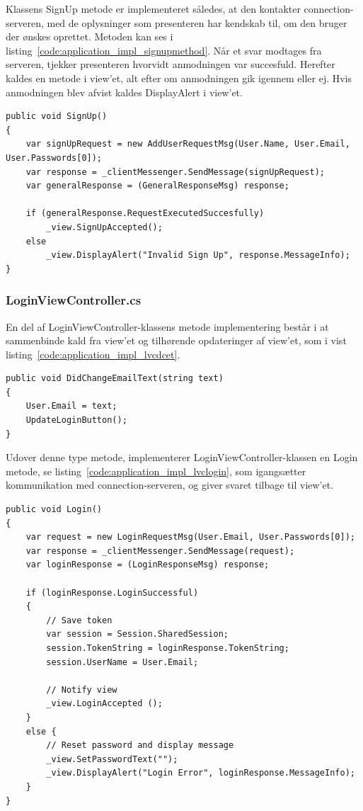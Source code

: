 Klassens SignUp metode er implementeret således, at den kontakter connection-serveren, med de oplysninger som presenteren har kendskab til, om den bruger der ønskes oprettet. Metoden kan ses i listing~\ref{code:application_impl_signupmethod}. Når et svar modtages fra serveren, tjekker presenteren hvorvidt anmodningen var succesfuld. Herefter kaldes en metode i view'et, alt efter om anmodningen gik igennem eller ej. Hvis anmodningen blev afvist kaldes DisplayAlert i view'et.

\begin{lstlisting}[caption={SignUp()},label={code:application_impl_signupmethod}]
public void SignUp()
{
	var signUpRequest = new AddUserRequestMsg(User.Name, User.Email, User.Passwords[0]);
	var response = _clientMessenger.SendMessage(signUpRequest);
	var generalResponse = (GeneralResponseMsg) response;

	if (generalResponse.RequestExecutedSuccesfully)
		_view.SignUpAccepted();
	else
		_view.DisplayAlert("Invalid Sign Up", response.MessageInfo);
}
\end{lstlisting}

\subsubsection{LoginViewController.cs}
En del af LoginViewController-klassens metode implementering består i at sammenbinde kald fra view'et og tilhørende opdateringer af view'et, som i vist listing~\ref{code:application_impl_lvcdcet}.

\begin{lstlisting}[caption={DidChangeEmailText(...)},label={code:application_impl_lvcdcet}]
public void DidChangeEmailText(string text)
{
	User.Email = text;
	UpdateLoginButton();
}
\end{lstlisting}

Udover denne type metode, implementerer LoginViewController-klassen en Login metode, se listing~\ref{code:application_impl_lvclogin}, som igangsætter kommunikation med connection-serveren, og giver svaret tilbage til view'et. 

\begin{lstlisting}[caption={Login()},label={code:application_impl_lvclogin}]
 public void Login()
{
	var request = new LoginRequestMsg(User.Email, User.Passwords[0]);
	var response = _clientMessenger.SendMessage(request);
	var loginResponse = (LoginResponseMsg) response;

	if (loginResponse.LoginSuccessful)
	{
		// Save token
		var session = Session.SharedSession;
		session.TokenString = loginResponse.TokenString;
		session.UserName = User.Email;

		// Notify view
		_view.LoginAccepted (); 
	}
	else {
		// Reset password and display message
		_view.SetPasswordText("");
		_view.DisplayAlert("Login Error", loginResponse.MessageInfo);
	}
}
\end{lstlisting}

